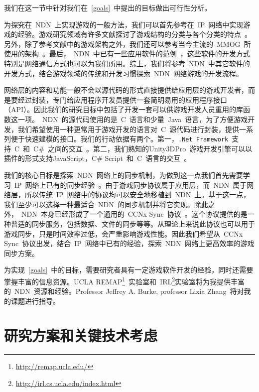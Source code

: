我们在这一节中针对我们在~\ref{goals}~中提出的目标做出可行性分析。

为探究在~NDN~上实现游戏的一般方法，我们可以首先参考在~IP~网络中实现游戏的经验。游戏研究领域有许多文献探讨了游戏结构的分类与各个分类的特点~\cite{Ferretti2005, cr, p2p1, p2p2}。另外，除了参考文献中的游戏架构之外，我们还可以参考当今主流的~MMOG~所使用的架构~\cite{WoW, quake}。最后，~NDN~中已有一些应用软件的范例~\cite{Zact, Zhu2011, andana, vehicle, voccn}，这些软件的开发方式特别是网络通信方式也可以为我们所用。综上，我们将参考~NDN~中其它软件的开发方式，结合游戏领域的传统和开发习惯探索~NDN~网络游戏的开发流程。

网络层的内容和功能一般不会以源代码的形式直接提供给应用层的游戏开发者，而是要经过封装，专门给应用程序开发员提供一套简明易用的应用程序接口（API）。因此我们的研究目标中包括了开发一套可以供游戏开发人员重用的库函数这一项。~NDN~的源代码使用的是~C~语言和少量~Java~语言，为了方便游戏开发，我们希望使用一种更常用于游戏开发的语言对~C~源代码进行封装，提供一系列便于快速建模的接口。我们的行动依据有两个。第一，\verb|.Net Framework|~支持~C~和~C\#~之间的交互~\cite{interop}。第二，我们熟知的Unity3D{\tm}Pro~游戏开发引擎可以以插件的形式支持JavaScript，C\# Script~和~C~语言的交互~\cite{plugin}。

我们的核心目标是探索~NDN~网络上的同步机制，为做到这一点我们首先需要学习~IP~网络上已有的同步经验~\cite{bryant, chandy, mimaze, hla, lockstep, fixed-bucket, Ferretti2005}。由于游戏同步协议属于应用层，而~NDN~属于网络层，所以传统~IP~网络中的协议均可以安全地移植到~NDN~上。基于这一点，我们至少可以选择一种最适合~NDN~的同步机制并将它实现。除此之外，~NDN~本身已经形成了一个通用的~CCNx Sync~协议~\cite{CCNxSync}。这个协议提供的是一种普适的同步服务，包括数据、文件的同步等等。从理论上来说此协议也可以用于游戏同步，只是时间效率过低，会严重影响游戏性能。因此我们希望从~CCNx Sync~协议出发，结合~IP~网络中已有的经验，探索~NDN~网络上更高效率的游戏同步方案。

为实现~\ref{goals}~中的目标，需要研究者具有一定游戏软件开发的经验，同时还需要掌握丰富的信息资源。UCLA REMAP\footnote{\url{http://remap.ucla.edu/}}~实验室和~IRL\footnote{\url{http://irl.cs.ucla.edu/index.html}}实验室将为我提供丰富的~NDN~资源和经验。Professor Jeffrey A. Burke, professor Lixia Zhang~将对我的课题进行指导。


\section{研究方案和关键技术考虑}

